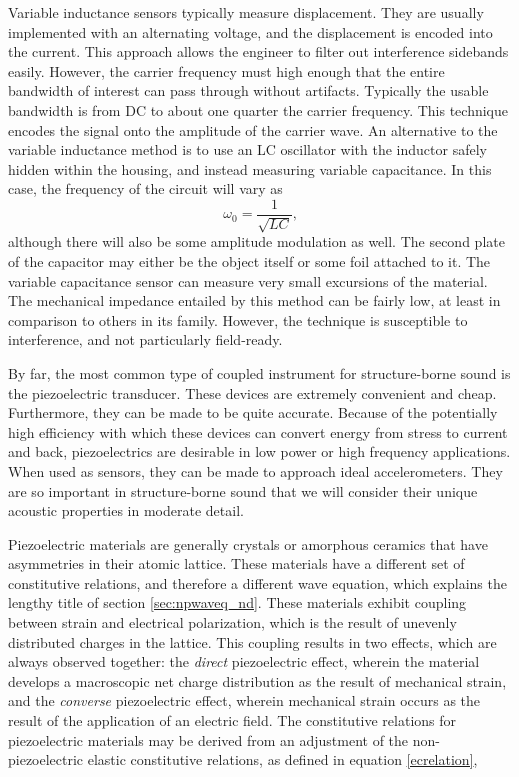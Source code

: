 \documentclass[a4paper,10pt]{report}
\numberwithin{equation}{section}
\begin{document}
{\begin{section}
\par
Variable inductance sensors typically measure displacement. They are usually implemented with an alternating voltage, and the displacement is encoded into the current. This approach allows the engineer to filter out interference sidebands easily. However, the carrier frequency must high enough that the entire bandwidth of interest can pass through without artifacts. Typically the usable bandwidth is from DC to about one quarter the carrier frequency. This technique encodes the signal onto the amplitude of the carrier wave. An alternative to the variable inductance method is to use an LC oscillator with the inductor safely hidden within the housing, and instead measuring variable capacitance. In this case, the frequency of the circuit will vary as 
\begin{equation*}
\omega_0 = \frac{1}{\sqrt{LC}} \text{,} 
\end{equation*}
although there will also be some amplitude modulation as well. The second plate of the capacitor may either be the object itself or some foil attached to it. The variable capacitance sensor can measure very small excursions of the material. The mechanical impedance entailed by this method can be fairly low, at least in comparison to others in its family. However, the technique is susceptible to interference, and not particularly field-ready. \cite{Cremer1973}
\par
By far, the most common type of coupled instrument for structure-borne sound is the piezoelectric transducer. These devices are extremely convenient and cheap. Furthermore, they can be made to be quite accurate. Because of the potentially high efficiency with which these devices can convert energy from stress to current and back, piezoelectrics are desirable in low power or high frequency applications. When used as sensors, they can be made to approach ideal accelerometers. \cite[p.~67]{Cremer1973} They are so important in structure-borne sound that we will consider their unique acoustic properties in moderate detail. 
\par
Piezoelectric materials are generally crystals or amorphous ceramics that have asymmetries in their atomic lattice. \cite[p.~17]{Kino1987} These materials have a different set of constitutive relations, and therefore a different wave equation, which explains the lengthy title of section \ref{sec:npwaveq_nd}. These materials exhibit coupling between strain and electrical polarization, which is the result of unevenly distributed charges in the lattice. This coupling results in two effects, which are always observed together: the \emph{direct} piezoelectric effect, wherein the material develops a macroscopic net charge distribution as the result of mechanical strain, and the \emph{converse} piezoelectric effect, wherein mechanical strain occurs as the result of the application of an electric field. \cite[p.~23]{Ballantine1997} The constitutive relations for piezoelectric materials may be derived from an adjustment of the non-piezoelectric elastic constitutive relations, as defined in equation \eqref{ecrelation},

\end{section}}
\end{document}
